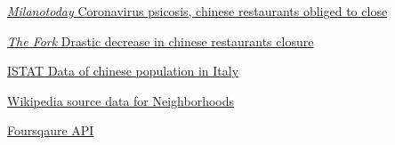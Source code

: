 \documentclass[12pt]{article} %
\newcounter{source}
\begin{document}
\newpage

\begin{thebibliography}{9}

 \href{https://www.milanotoday.it/economia/ristoranti-cinesi-coronavirus.html}{\emph{Milanotoday} Coronavirus psicosis, chinese restaurants obliged to close}

 \href{https://www.startupmagazine.it/in-calo-le-prenotazioni-di-ristoranti-cinesi-thefork-si-unisce-a-iovadoalcinese/}{\emph{The Fork} Drastic decrease in chinese restaurants closure}

 \href{https://www.tuttitalia.it/statistiche/cittadini-stranieri/repubblica-popolare-cinese/}{ISTAT Data of chinese population in Italy}

 \href{https://it.wikipedia.org/wiki/Categoria:Quartieri_di_Milano}{Wikipedia source data for Neighborhoods}

 \href{https://developer.foursquare.com/developer/}{Foursqaure API}

\end{thebibliography}
\end{document}
